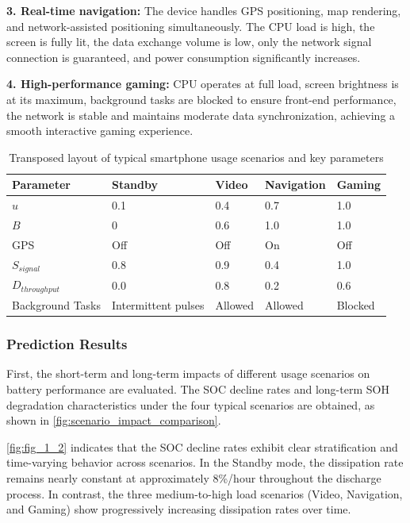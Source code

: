 \documentclass{mcmthesis}
\begin{document}
\vspace{-3pt}
\textbf{3. Real-time navigation:} 
The device handles GPS positioning, map rendering, and network-assisted positioning simultaneously. The CPU load is high, the screen is fully lit, the data exchange volume is low, only the network signal connection is guaranteed, and power consumption significantly increases.

\vspace{-3pt}
\textbf{4. High-performance gaming:} 
CPU operates at full load, screen brightness is at its maximum, background tasks are blocked to ensure front-end performance, the network is stable and maintains moderate data synchronization, achieving a smooth interactive gaming experience.
\begin{table}[htbp]
\centering
\caption{Transposed layout of typical smartphone usage scenarios and key parameters}
\vspace{-0.4cm}
\label{tab:usage_scenarios_transposed}
\begin{tabularx}{\textwidth}{lXXXX}
\toprule
\textbf{Parameter} & \textbf{Standby} & \textbf{Video } & \textbf{Navigation} & \textbf{Gaming} \\
\midrule
 $u$ & 0.1 & 0.4 & 0.7 & 1.0 \\
$B$ & 0 & 0.6 & 1.0 & 1.0 \\
 GPS & Off & Off & On & Off \\
 $S_{signal}$ & 0.8 & 0.9 & 0.4 & 1.0 \\
 $D_{throughput}$ & 0.0 & 0.8 & 0.2 & 0.6 \\
Background Tasks & Intermittent pulses & Allowed & Allowed & Blocked \\
\bottomrule
\end{tabularx}

\end{table}




\subsubsection*{Prediction Results}
First, the short-term and long-term impacts of different usage scenarios on battery performance are evaluated. The SOC decline rates and long-term SOH degradation characteristics under the four typical scenarios are obtained, as shown in \autoref{fig:scenario_impact_comparison}.

\autoref{fig:fig_1_2} indicates that the SOC decline rates exhibit clear stratification and time-varying behavior across scenarios. In the Standby mode, the dissipation rate remains nearly constant at approximately 8\%/hour throughout the discharge process. In contrast, the three medium-to-high load scenarios (Video, Navigation, and Gaming) show progressively increasing dissipation rates over time.
\end{document}
